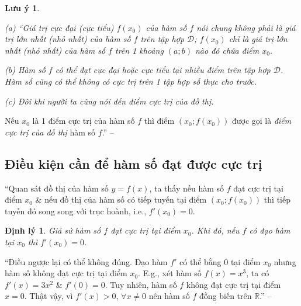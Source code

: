 \documentclass[oneside]{book}
\numberwithin{equation}{section}
\newtheorem{luuy}{Lưu ý}[section]
\newtheorem{dinhly}{Định lý}[section]
\begin{document}
\begin{luuy}
	\begin{enumerate*}
		\item[(a)] ``Giá trị cực đại (cực tiểu) $f(x_0)$ của hàm số $f$ nói chung không phải là giá trị lớn nhất (nhỏ nhất) của hàm số $f$ trên tập hợp $\mathcal{D}$; $f(x_0)$ chỉ là giá trị lớn nhất (nhỏ nhất) của hàm số $f$ trên 1 khoảng $(a;b)$ nào đó chứa điểm $x_0$.
		\item[(b)] Hàm số $f$ có thể đạt cực đại hoặc cực tiểu tại nhiều điểm trên tập hợp $\mathcal{D}$. Hàm số cũng có thể không có cực trị trên 1 tập hợp số thực cho trước.
		\item[(c)] Đôi khi người ta cũng nói đến điểm cực trị của đồ thị.
	\end{enumerate*}
\end{luuy}
Nếu $x_0$ là 1 điểm cực trị của hàm số $f$ thì điểm $(x_0;f(x_0))$ được gọi là \textit{điểm cực trị của đồ thị} hàm số $f$.'' -- \cite[p. 11]{SGK_Toan_12_giai_tich_nang_cao}

\subsection{Điều kiện cần để hàm số đạt được cực trị}
``Quan sát đồ thị của hàm số $y = f(x)$, ta thấy nếu hàm số $f$ đạt cực trị tại điểm $x_0$ \& nếu đồ thị của hàm số có tiếp tuyến tại điểm $(x_0;f(x_0))$ thì tiếp tuyến đó song song với trục hoành, i.e., $f'(x_0) = 0$.

\begin{dinhly}
	Giả sử hàm số $f$ đạt cực trị tại điểm $x_0$. Khi đó, nếu $f$ có đạo hàm tại $x_0$ thì $f'(x_0) = 0$.
\end{dinhly}
``Điều ngược lại có thể không đúng. Đạo hàm $f'$ có thể bằng $0$ tại điểm $x_0$ nhưng hàm số không đạt cực trị tại điểm $x_0$. E.g., xét hàm số $f(x) = x^3$, ta có $f'(x) = 3x^2$ \& $f'(0) = 0$. Tuy nhiên, hàm số $f$ không đạt cực trị tại điểm $x = 0$. Thật vậy, vì $f'(x) > 0$, $\forall x\ne 0$ nên hàm số $f$ đồng biến trên $\mathbb{R}$.'' -- \cite[p. 11]{SGK_Toan_12_giai_tich_nang_cao}
\end{document}
